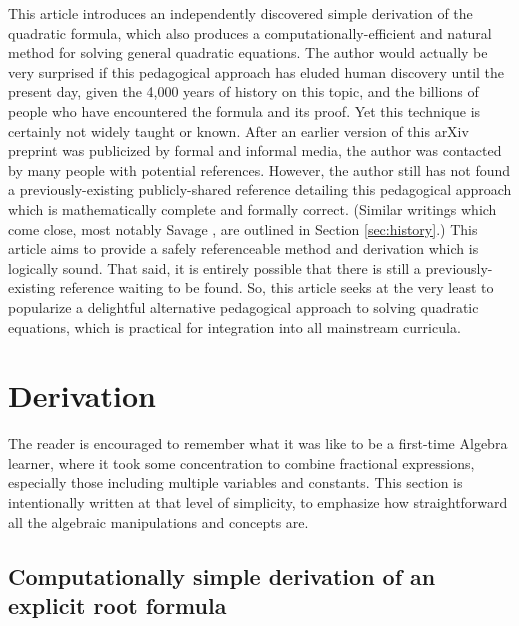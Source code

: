 \documentclass[11pt]{article}
\begin{document}
This article introduces an independently discovered simple derivation of the
quadratic formula, which also produces a computationally-efficient and natural
method for solving general quadratic equations. The author would actually be
very surprised if this pedagogical approach has eluded human discovery until the
present day, given the 4,000 years of history on this topic, and the billions of
people who have encountered the formula and its proof. Yet this technique is
certainly not widely taught or known. After an earlier version of this arXiv
preprint was publicized by formal and informal media, the author was contacted
by many people with potential references. However, the author still has not
found a previously-existing publicly-shared reference detailing this pedagogical
approach which is mathematically complete and formally correct. (Similar
writings which come close, most notably Savage \cite{savage}, are outlined in
Section \ref{sec:history}.) This article aims to provide a safely referenceable
method and derivation which is logically sound. That said, it is entirely
possible that there is still a previously-existing reference waiting to be
found. So, this article seeks at the very least to popularize a delightful
alternative pedagogical approach to solving quadratic equations, which is
practical for integration into all mainstream curricula.


\section{Derivation}

The reader is encouraged to remember what it was like to be a first-time
Algebra learner, where it took some concentration to combine fractional
expressions, especially those including multiple variables and constants.
This section is intentionally written at that level of simplicity, to
emphasize how straightforward all the algebraic manipulations and concepts
are.

\subsection{Computationally simple derivation of an explicit root formula}
\label{sec:monic}
\end{document}

